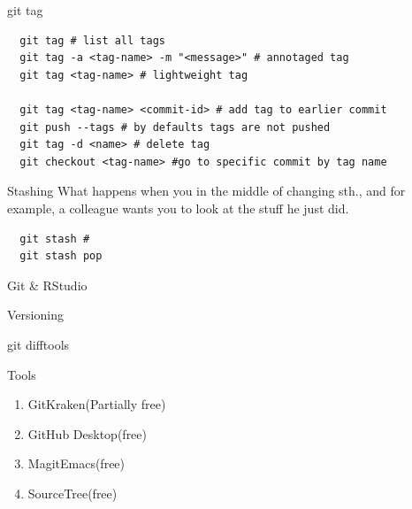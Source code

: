\documentclass{beamer}
\begin{document}
\begin{frame}[fragile,t]{git tag}\vspace{10pt}
  \begin{lstlisting}
  git tag # list all tags
  git tag -a <tag-name> -m "<message>" # annotaged tag
  git tag <tag-name> # lightweight tag

  git tag <tag-name> <commit-id> # add tag to earlier commit
  git push --tags # by defaults tags are not pushed
  git tag -d <name> # delete tag
  git checkout <tag-name> #go to specific commit by tag name\end{lstlisting}
\end{frame}

\begin{frame}[fragile,t]{Stashing}\vspace{10pt}
  What happens when you in the middle of changing sth., and for example, a colleague wants you to look at the stuff he just did.
  \begin{lstlisting}
  git stash #
  git stash pop\end{lstlisting}
\end{frame}


\begin{frame}[fragile,t]{Git \& RStudio}\vspace{10pt}
\end{frame}

\begin{frame}[fragile,t]{Versioning}\vspace{10pt}
\end{frame}

\begin{frame}[fragile,t]{git difftools}\vspace{10pt}
\end{frame}

\begin{frame}[fragile,t]{Tools}\vspace{10pt}
  \begin{enumerate}
    \item GitKraken(Partially free)
      \item GitHub Desktop(free)
    \item Magit{Emacs}(free)
    \item SourceTree(free)
  \end{enumerate}
\end{frame}
\end{document}
